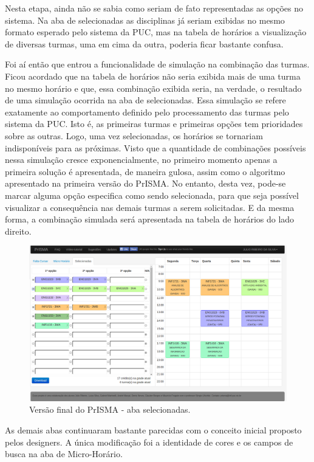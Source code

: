 \documentclass[graduacao,brazil]{ThesisPUC}
\begin{document}
Nesta etapa, ainda não se sabia como seriam de fato representadas as opções no sistema. Na aba de selecionadas as disciplinas já seriam exibidas no mesmo formato esperado pelo sistema da PUC, mas na tabela de horários a visualização de diversas turmas, uma em cima da outra, poderia ficar bastante confusa.

Foi aí então que entrou a funcionalidade de simulação na combinação das turmas. Ficou acordado que na tabela de horários não seria exibida mais de uma turma no mesmo horário e que, essa combinação exibida seria, na verdade, o resultado de uma simulação ocorrida na aba de selecionadas. Essa simulação se refere exatamente ao comportamento definido pelo processamento das turmas pelo sistema da PUC. Isto é, as primeiras turmas e primeiras opções tem prioridades sobre as outras. Logo, uma vez selecionadas, os horários se tornariam indisponíveis para as próximas. 
Visto que a quantidade de combinações possíveis nessa simulação cresce exponencialmente, no primeiro momento apenas a primeira solução é apresentada, de maneira gulosa, assim como o algoritmo apresentado na primeira versão do PrISMA. No entanto, desta vez, pode-se marcar alguma opção especifica como sendo selecionada, para que seja possível visualizar a consequência nas demais turmas a serem solicitadas. E da mesma forma, a combinação simulada será apresentada na tabela de horários do lado direito.

\begin{figure}[H]
    \centering
    \includegraphics[width=\linewidth]{img/v3_selecionadas.png}
    \caption{Versão final do PrISMA - aba selecionadas.}
\end{figure}

As demais abas continuaram bastante parecidas com o conceito inicial proposto pelos designers. A única modificação foi a identidade de cores e os campos de busca na aba de Micro-Horário.
\end{document}
